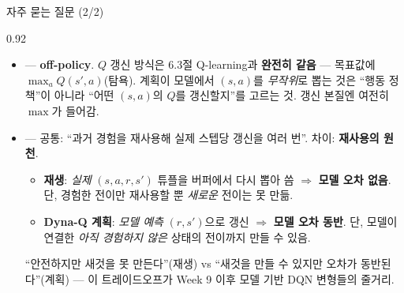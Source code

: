 \begin{frame}{자주 묻는 질문 (2/2)}
\begin{center}\begin{varwidth}{0.92\textwidth}
  \begin{itemize}
    \item {}
      --- \textbf{off-policy}. $Q$ 갱신 방식은 6.3절 Q-learning과
      \textbf{완전히 같음} --- 목표값에 $\max_a Q(s',a)$(탐욕).
      계획이 모델에서 $(s,a)$를 \textit{무작위}로 뽑는 것은
      ``행동 정책''이 아니라 ``어떤 $(s,a)$의 $Q$를 갱신할지''를
      고르는 것. 갱신 본질엔 여전히 $\max$가 들어감.
    \item {}
      --- 공통: ``과거 경험을 재사용해 실제 스텝당 갱신을 여러
      번''. 차이: \textbf{재사용의 원천}.
      \begin{itemize}
        \item \textbf{재생}: \textit{실제} $(s,a,r,s')$ 튜플을
          버퍼에서 다시 뽑아 씀 $\Rightarrow$ \textbf{모델 오차
          없음}. 단, 경험한 전이만 재사용할 뿐 \textit{새로운}
          전이는 못 만듦.
        \item \textbf{Dyna-Q 계획}: \textit{모델 예측} $(r,s')$으로
          갱신 $\Rightarrow$ \textbf{모델 오차 동반}. 단, 모델이
          연결한 \textit{아직 경험하지 않은} 상태의 전이까지
          만들 수 있음.
      \end{itemize}
      ``안전하지만 새것을 못 만든다''(재생) vs ``새것을 만들 수
      있지만 오차가 동반된다''(계획) --- 이 트레이드오프가
      Week 9 이후 모델 기반 DQN 변형들의 줄거리.
  \end{itemize}
\end{varwidth}\end{center}
\end{frame}
